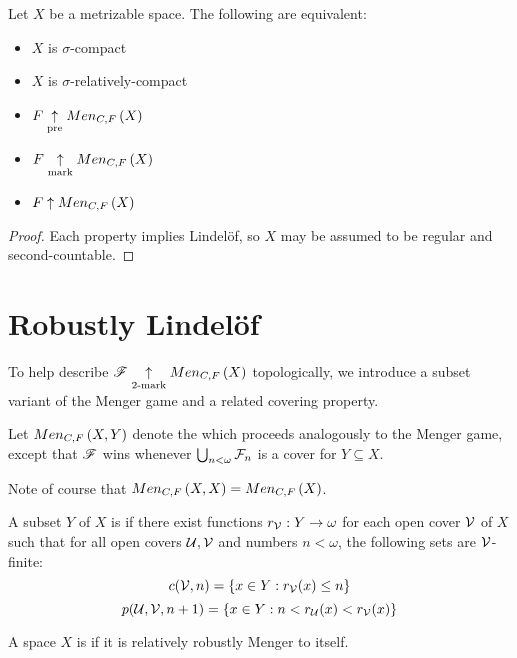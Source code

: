 \begin{cor}
  Let $X$ be a metrizable space. The following are equivalent:
  \begin{itemize}
    \item $X$ is $\sigma$-compact
    \item $X$ is $\sigma$-relatively-compact
    \item $F \underset{\text{pre}}{\uparrow} Men_{C,F}\left({X}\right)$
    \item $F \underset{\text{mark}}{\uparrow} Men_{C,F}\left({X}\right)$
    \item $F \uparrow Men_{C,F}\left({X}\right)$
  \end{itemize}
\end{cor}

\begin{proof}
  Each property implies Lindel\"of, so $X$ may be assumed to be
  regular and second-countable.
\end{proof}



\section{Robustly Lindel\"of}

To help describe $\mathscr{F}\underset{2\text{-mark}}{\uparrow}Men_{C,F}\left({X}\right)$ topologically, we introduce a
subset variant of the Menger game and a related covering property.

\begin{game}
  Let $Men_{C,F}\left({X,Y}\right)$ denote the  which proceeds
  analogously to the Menger game, except that $\mathscr{F}$ wins whenever
  $\bigcup_{n<\omega} \mathcal{F}_n$ is a cover for $Y\subseteq X$.
\end{game}

Note of course that $Men_{C,F}\left({X,X}\right)=Men_{C,F}\left({X}\right)$.

\begin{defn}
  A subset $Y$ of $X$ is  if there exist
  functions $r_{\mathcal{V}}:Y\to\omega$
  for each open cover $\mathcal{V}$ of $X$ such that
  for all open covers $\mathcal{U},\mathcal{V}$ and numbers $n<\omega$,
  the following sets are $\mathcal{V}$-finite:
    \[
      c(\mathcal{V},n)=\{ x\in Y : r_{\mathcal{V}}(x)\leq n\}
    \]
    \[
      p(\mathcal{U},\mathcal{V},n+1)=\{ x\in Y : n<r_{\mathcal{U}}(x)<r_{\mathcal{V}}(x)\}
    \]
\end{defn}

\begin{defn}
  A space $X$ is  if it is relatively robustly
  Menger to itself.
\end{defn}

